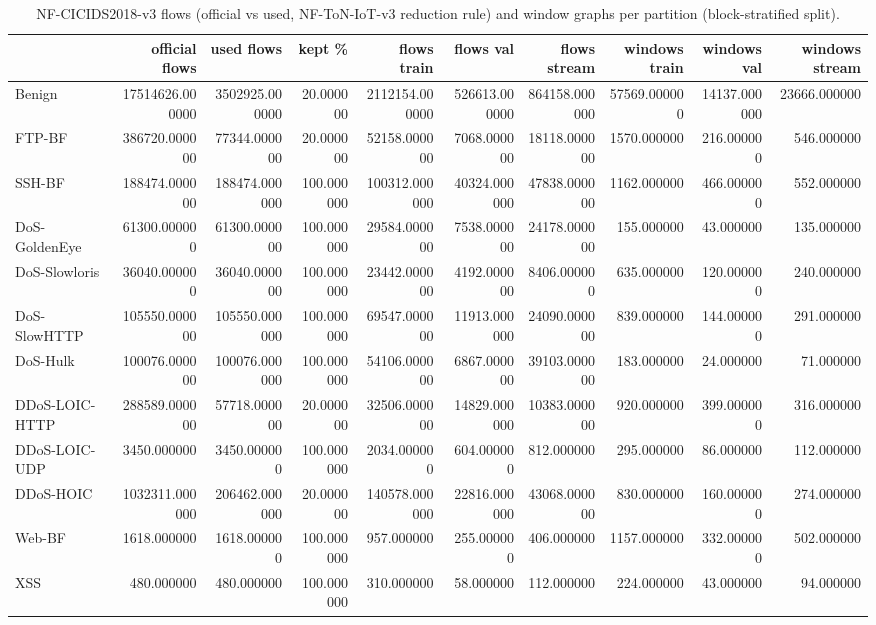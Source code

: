 \begin{table}
\caption{NF-CICIDS2018-v3 flows (official vs used, NF-ToN-IoT-v3 reduction rule) and window graphs per partition (block-stratified split).}
\label{tab:table5_dataset}
\begin{tabular}{lrrrrrrrrr}
\toprule
 & official flows & used flows & kept \% & flows train & flows val & flows stream & windows train & windows val & windows stream \\
\midrule
Benign & 17514626.000000 & 3502925.000000 & 20.000000 & 2112154.000000 & 526613.000000 & 864158.000000 & 57569.000000 & 14137.000000 & 23666.000000 \\
FTP-BF & 386720.000000 & 77344.000000 & 20.000000 & 52158.000000 & 7068.000000 & 18118.000000 & 1570.000000 & 216.000000 & 546.000000 \\
SSH-BF & 188474.000000 & 188474.000000 & 100.000000 & 100312.000000 & 40324.000000 & 47838.000000 & 1162.000000 & 466.000000 & 552.000000 \\
DoS-GoldenEye & 61300.000000 & 61300.000000 & 100.000000 & 29584.000000 & 7538.000000 & 24178.000000 & 155.000000 & 43.000000 & 135.000000 \\
DoS-Slowloris & 36040.000000 & 36040.000000 & 100.000000 & 23442.000000 & 4192.000000 & 8406.000000 & 635.000000 & 120.000000 & 240.000000 \\
DoS-SlowHTTP & 105550.000000 & 105550.000000 & 100.000000 & 69547.000000 & 11913.000000 & 24090.000000 & 839.000000 & 144.000000 & 291.000000 \\
DoS-Hulk & 100076.000000 & 100076.000000 & 100.000000 & 54106.000000 & 6867.000000 & 39103.000000 & 183.000000 & 24.000000 & 71.000000 \\
DDoS-LOIC-HTTP & 288589.000000 & 57718.000000 & 20.000000 & 32506.000000 & 14829.000000 & 10383.000000 & 920.000000 & 399.000000 & 316.000000 \\
DDoS-LOIC-UDP & 3450.000000 & 3450.000000 & 100.000000 & 2034.000000 & 604.000000 & 812.000000 & 295.000000 & 86.000000 & 112.000000 \\
DDoS-HOIC & 1032311.000000 & 206462.000000 & 20.000000 & 140578.000000 & 22816.000000 & 43068.000000 & 830.000000 & 160.000000 & 274.000000 \\
Web-BF & 1618.000000 & 1618.000000 & 100.000000 & 957.000000 & 255.000000 & 406.000000 & 1157.000000 & 332.000000 & 502.000000 \\
XSS & 480.000000 & 480.000000 & 100.000000 & 310.000000 & 58.000000 & 112.000000 & 224.000000 & 43.000000 & 94.000000 \\

\end{tabular}
\end{table}
